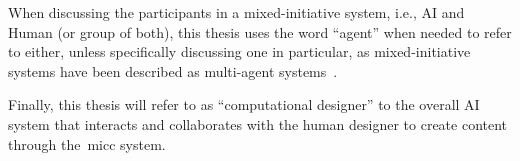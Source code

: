 
When discussing the participants in a mixed-initiative system, i.e., AI and Human (or group of both), this thesis uses the word ``agent'' when needed to refer to either, unless specifically discussing one in particular, as mixed-initiative systems have been described as multi-agent systems~\cite{Allen99-MIinteraction}.

Finally, this thesis will refer to as ``computational designer'' to the overall AI system that interacts and collaborates with the human designer to create content through the~\acrshort{micc} system.




